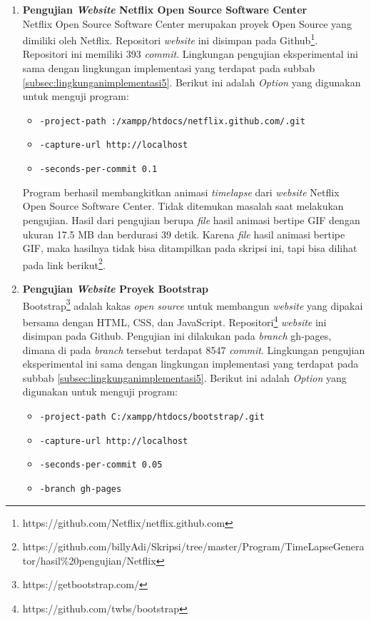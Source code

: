 \begin{enumerate}
\item \textbf{Pengujian \textit{Website} Netflix Open Source Software Center}\\
Netflix Open Source Software Center merupakan proyek Open Source yang dimiliki oleh Netflix. Repositori \textit{website} ini disimpan pada Github\footnote{https://github.com/Netflix/netflix.github.com}. Repositori ini memiliki 393 \textit{commit}. Lingkungan pengujian eksperimental ini sama dengan lingkungan implementasi yang terdapat pada subbab \ref{subsec:lingkunganimplementasi5}. Berikut ini adalah \textit{Option} yang digunakan untuk menguji program:
\begin{itemize}
\item \texttt{-project-path :/xampp/htdocs/netflix.github.com/.git}
\item \texttt{-capture-url http://localhost}
\item \texttt{-seconds-per-commit 0.1} 
\end{itemize}
Program berhasil membangkitkan animasi \textit{timelapse} dari \textit{website} Netflix Open Source Software Center. Tidak ditemukan masalah saat melakukan pengujian. Hasil dari pengujian berupa \textit{file} hasil animasi bertipe GIF dengan ukuran 17.5 MB dan berdurasi 39 detik. Karena \textit{file} hasil animasi bertipe GIF, maka hasilnya tidak bisa ditampilkan pada skripsi ini, tapi bisa dilihat pada link berikut\footnote{https://github.com/billyAdi/Skripsi/tree/master/Program/TimeLapseGenerator/hasil\%20pengujian/Netflix}.


\item \textbf{Pengujian \textit{Website} Proyek Bootstrap}\\
Bootstrap\footnote{https://getbootstrap.com/} adalah kakas \textit{open source} untuk membangun \textit{website} yang dipakai bersama dengan HTML, CSS, dan JavaScript. Repositori\footnote{https://github.com/twbs/bootstrap} \textit{website} ini disimpan pada Github. Pengujian ini dilakukan pada \textit{branch} gh-pages, dimana di pada \textit{branch} tersebut terdapat 8547 \textit{commit}. Lingkungan pengujian eksperimental ini sama dengan lingkungan implementasi yang terdapat pada subbab \ref{subsec:lingkunganimplementasi5}. 
Berikut ini adalah \textit{Option} yang digunakan untuk menguji program:
\begin{itemize}
\item \texttt{-project-path C:/xampp/htdocs/bootstrap/.git}
\item \texttt{-capture-url http://localhost}
\item \texttt{-seconds-per-commit 0.05} 
\item \texttt{-branch gh-pages}
\end{itemize}


\end{enumerate}

